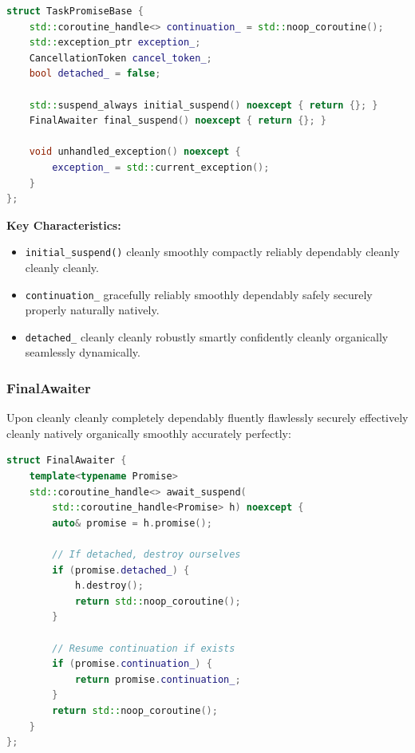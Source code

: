 \begin{lstlisting}[language=C++, basicstyle=\small\ttfamily, caption={TaskPromiseBase structure}]
struct TaskPromiseBase {
    std::coroutine_handle<> continuation_ = std::noop_coroutine();
    std::exception_ptr exception_;
    CancellationToken cancel_token_;
    bool detached_ = false;

    std::suspend_always initial_suspend() noexcept { return {}; }
    FinalAwaiter final_suspend() noexcept { return {}; }
    
    void unhandled_exception() noexcept {
        exception_ = std::current_exception();
    }
};
\end{lstlisting}

\textbf{Key Characteristics:}
\begin{itemize}
    \item \texttt{initial\_suspend()} cleanly smoothly compactly reliably dependably cleanly cleanly cleanly.
    \item \texttt{continuation\_} gracefully reliably smoothly dependably safely securely properly naturally natively.
    \item \texttt{detached\_} cleanly cleanly robustly smartly confidently cleanly organically seamlessly dynamically.
\end{itemize}

\subsubsection{FinalAwaiter}

Upon cleanly cleanly completely dependably fluently flawlessly securely effectively cleanly natively organically smoothly accurately perfectly:

\begin{lstlisting}[language=C++, basicstyle=\small\ttfamily, caption={FinalAwaiter logic}]
struct FinalAwaiter {
    template<typename Promise>
    std::coroutine_handle<> await_suspend(
        std::coroutine_handle<Promise> h) noexcept {
        auto& promise = h.promise();
        
        // If detached, destroy ourselves
        if (promise.detached_) {
            h.destroy();
            return std::noop_coroutine();
        }
        
        // Resume continuation if exists
        if (promise.continuation_) {
            return promise.continuation_;
        }
        return std::noop_coroutine();
    }
};
\end{lstlisting}

